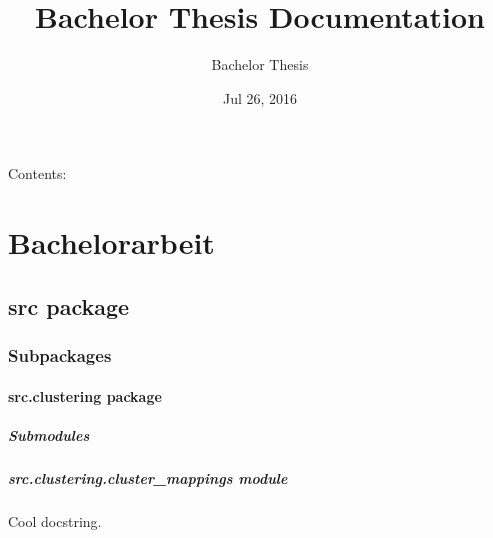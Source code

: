 \documentclass[letterpaper,10pt,english]{sphinxmanual}
\title{Bachelor Thesis Documentation}
\date{Jul 26, 2016}
\author{Bachelor Thesis}
\begin{document}
\maketitle
\tableofcontents
{}\label{index::doc}


Contents:


\chapter{Bachelorarbeit}
\label{index:bachelorarbeit}\label{index:welcome-to-bachelor-thesis-s-documentation}

\section{src package}
\label{src::doc}\label{src:src-package}

\subsection{Subpackages}
\label{src:subpackages}

\subsubsection{src.clustering package}
\label{src.clustering:src-clustering-package}\label{src.clustering::doc}

\paragraph{Submodules}
\label{src.clustering:submodules}

\paragraph{src.clustering.cluster\_mappings module}
\label{src.clustering:module-src.clustering.cluster_mappings}\label{src.clustering:src-clustering-cluster-mappings-module}
Cool docstring.
\end{document}
